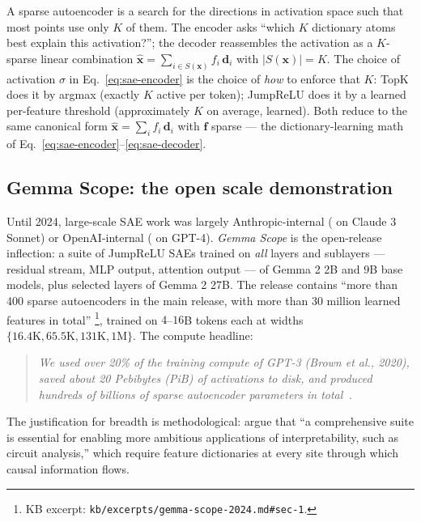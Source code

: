 \begin{intuition}
A sparse autoencoder is a search for the directions in activation space
such that most points use only $K$ of them. The encoder asks ``which
$K$ dictionary atoms best explain this activation?''; the decoder
reassembles the activation as a $K$-sparse linear combination
$\hat{\mathbf{x}} = \sum_{i \in S(\mathbf{x})} f_i\,\mathbf{d}_i$ with
$|S(\mathbf{x})| = K$. The choice of activation $\sigma$ in
Eq.~\eqref{eq:sae-encoder} is the choice of \emph{how} to enforce that
$K$: TopK does it by argmax (exactly $K$ active per token); JumpReLU
does it by a learned per-feature threshold (approximately $K$ on
average, learned). Both reduce to the same canonical form
$\hat{\mathbf{x}} = \sum_i f_i\,\mathbf{d}_i$ with $\mathbf{f}$
sparse --- the dictionary-learning math of
Eq.~\eqref{eq:sae-encoder}--\eqref{eq:sae-decoder}.
\end{intuition}

\subsection{Gemma Scope: the open scale demonstration}
\label{sec:sae-gemma-scope}

Until 2024, large-scale SAE work was largely Anthropic-internal
(\citealp{templeton2024-scaling-monosemanticity} on Claude 3 Sonnet)
or OpenAI-internal (\citealp{gao2024-topk-saes} on GPT-4). \emph{Gemma
Scope} \citep{gemma-scope-2024} is the open-release inflection: a
suite of JumpReLU SAEs trained on \emph{all} layers and sublayers ---
residual stream, MLP output, attention output --- of Gemma 2 2B and
9B base models, plus selected layers of Gemma 2 27B. The release
contains ``more than 400 sparse autoencoders in the main release, with
more than 30 million learned features in total''
\citep[\S 1]{gemma-scope-2024}\footnote{KB excerpt:
\texttt{kb/excerpts/gemma-scope-2024.md\#sec-1}.}, trained on
$4$--$16$B tokens each at widths $\{16.4\text{K}, 65.5\text{K},
131\text{K}, 1\text{M}\}$. The compute headline:
\begin{quote}
\itshape
We used over 20\% of the training compute of GPT-3 (Brown et al., 2020),
saved about 20 Pebibytes (PiB) of activations to disk, and produced
hundreds of billions of sparse autoencoder parameters in
total~\citep[\S 1]{gemma-scope-2024}.
\end{quote}
The justification for breadth is methodological:
\citet[\S 1]{gemma-scope-2024} argue that
``a comprehensive suite is essential for enabling more ambitious
applications of interpretability, such as circuit analysis,'' which
require feature dictionaries at every site through which causal
information flows.

